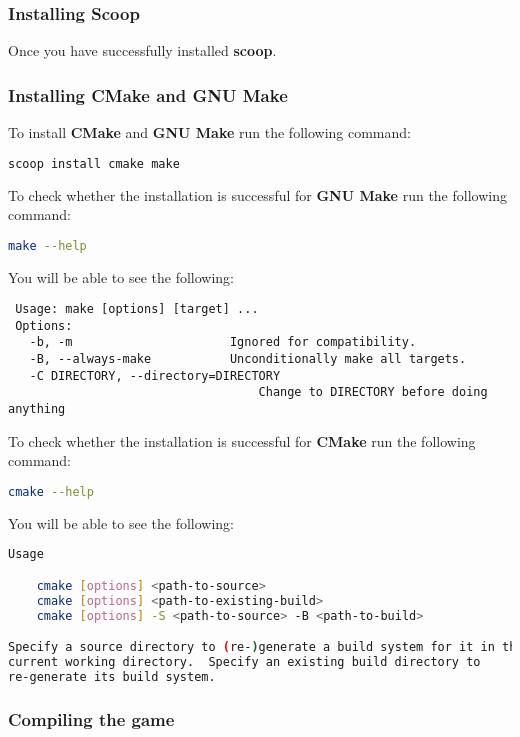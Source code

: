 \subsubsection{Installing Scoop}
Once you have successfully installed \textbf{scoop}.

\subsubsection{Installing CMake and GNU Make}
To install \textbf{CMake} and \textbf{GNU Make} run the following
command:

\begin{lstlisting}[language=bash]
 scoop install cmake make 
\end{lstlisting}
 
To check whether the installation is successful for \textbf{GNU Make} run the following command:

\begin{lstlisting}[language=bash]
make --help
\end{lstlisting}

You will be able to see the following:
\begin{lstlisting}
 Usage: make [options] [target] ...
 Options:
   -b, -m                      Ignored for compatibility.
   -B, --always-make           Unconditionally make all targets.
   -C DIRECTORY, --directory=DIRECTORY
                                   Change to DIRECTORY before doing anything
\end{lstlisting}
    
To check whether the installation is successful for \textbf{CMake} run the following command:

\begin{lstlisting}[language=bash]
cmake --help
\end{lstlisting}

You will be able to see the following:

\begin{lstlisting}[language=bash]
Usage

    cmake [options] <path-to-source>
    cmake [options] <path-to-existing-build>
    cmake [options] -S <path-to-source> -B <path-to-build>

Specify a source directory to (re-)generate a build system for it in the
current working directory.  Specify an existing build directory to
re-generate its build system.
\end{lstlisting}

\subsubsection{Compiling the game}


